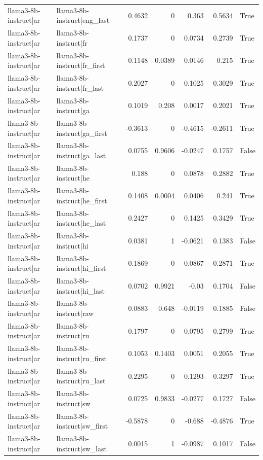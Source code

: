\begin{table}
\begin{tabular}{l l r r r r l}
llama3-8b-instruct|ar & llama3-8b-instruct|eng_last & 0.4632 & 0 & 0.363 & 0.5634 & True \\
llama3-8b-instruct|ar & llama3-8b-instruct|fr & 0.1737 & 0 & 0.0734 & 0.2739 & True \\
llama3-8b-instruct|ar & llama3-8b-instruct|fr_first & 0.1148 & 0.0389 & 0.0146 & 0.215 & True \\
llama3-8b-instruct|ar & llama3-8b-instruct|fr_last & 0.2027 & 0 & 0.1025 & 0.3029 & True \\
llama3-8b-instruct|ar & llama3-8b-instruct|ga & 0.1019 & 0.208 & 0.0017 & 0.2021 & True \\
llama3-8b-instruct|ar & llama3-8b-instruct|ga_first & -0.3613 & 0 & -0.4615 & -0.2611 & True \\
llama3-8b-instruct|ar & llama3-8b-instruct|ga_last & 0.0755 & 0.9606 & -0.0247 & 0.1757 & False \\
llama3-8b-instruct|ar & llama3-8b-instruct|he & 0.188 & 0 & 0.0878 & 0.2882 & True \\
llama3-8b-instruct|ar & llama3-8b-instruct|he_first & 0.1408 & 0.0004 & 0.0406 & 0.241 & True \\
llama3-8b-instruct|ar & llama3-8b-instruct|he_last & 0.2427 & 0 & 0.1425 & 0.3429 & True \\
llama3-8b-instruct|ar & llama3-8b-instruct|hi & 0.0381 & 1 & -0.0621 & 0.1383 & False \\
llama3-8b-instruct|ar & llama3-8b-instruct|hi_first & 0.1869 & 0 & 0.0867 & 0.2871 & True \\
llama3-8b-instruct|ar & llama3-8b-instruct|hi_last & 0.0702 & 0.9921 & -0.03 & 0.1704 & False \\
llama3-8b-instruct|ar & llama3-8b-instruct|raw & 0.0883 & 0.648 & -0.0119 & 0.1885 & False \\
llama3-8b-instruct|ar & llama3-8b-instruct|ru & 0.1797 & 0 & 0.0795 & 0.2799 & True \\
llama3-8b-instruct|ar & llama3-8b-instruct|ru_first & 0.1053 & 0.1403 & 0.0051 & 0.2055 & True \\
llama3-8b-instruct|ar & llama3-8b-instruct|ru_last & 0.2295 & 0 & 0.1293 & 0.3297 & True \\
llama3-8b-instruct|ar & llama3-8b-instruct|sw & 0.0725 & 0.9833 & -0.0277 & 0.1727 & False \\
llama3-8b-instruct|ar & llama3-8b-instruct|sw_first & -0.5878 & 0 & -0.688 & -0.4876 & True \\
llama3-8b-instruct|ar & llama3-8b-instruct|sw_last & 0.0015 & 1 & -0.0987 & 0.1017 & False \\

\end{tabular}
\end{table}
